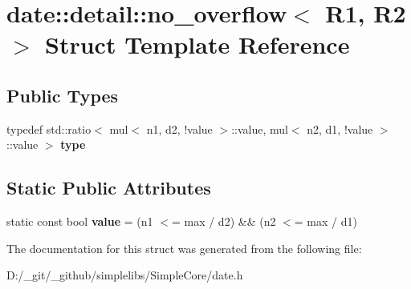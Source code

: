 \hypertarget{structdate_1_1detail_1_1no__overflow}{}\section{date\+::detail\+::no\+\_\+overflow$<$ R1, R2 $>$ Struct Template Reference}
\label{structdate_1_1detail_1_1no__overflow}
\subsection*{Public Types}
\begin{DoxyCompactItemize}
\item 
\mbox{\label{structdate_1_1detail_1_1no__overflow_acbe362ef1be750938c98a0994ea2a6c8}} 
typedef std\+::ratio$<$ mul$<$ n1, d2, !value $>$\+::value, mul$<$ n2, d1, !value $>$\+::value $>$ {\bfseries type}
\end{DoxyCompactItemize}
\subsection*{Static Public Attributes}
\begin{DoxyCompactItemize}
\item 
\mbox{\label{structdate_1_1detail_1_1no__overflow_a9cdd909af2cd654f15401c505ed14e8f}} 
static const bool {\bfseries value} = (n1 $<$= max / d2) \&\& (n2 $<$= max / d1)
\end{DoxyCompactItemize}


The documentation for this struct was generated from the following file\+:\begin{DoxyCompactItemize}
\item 
D\+:/\+\_\+git/\+\_\+github/simplelibs/\+Simple\+Core/date.\+h\end{DoxyCompactItemize}
